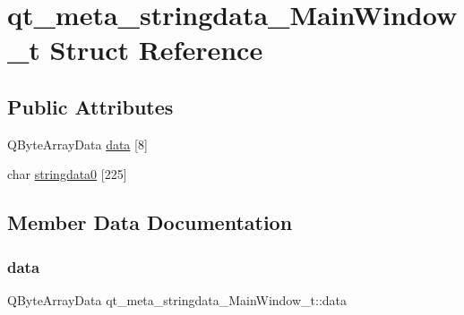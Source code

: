 \hypertarget{structqt__meta__stringdata___main_window__t}{}\section{qt\+\_\+meta\+\_\+stringdata\+\_\+\+Main\+Window\+\_\+t Struct Reference}
\label{structqt__meta__stringdata___main_window__t}
\subsection*{Public Attributes}
\begin{DoxyCompactItemize}
\item 
Q\+Byte\+Array\+Data \hyperlink{structqt__meta__stringdata___main_window__t_a092956d0ba2e51cd73092e8a5ebb6ce6}{data} \mbox{[}8\mbox{]}
\item 
char \hyperlink{structqt__meta__stringdata___main_window__t_a88959992f1140a84ca21ab555f0345a1}{stringdata0} \mbox{[}225\mbox{]}
\end{DoxyCompactItemize}


\subsection{Member Data Documentation}
\hypertarget{structqt__meta__stringdata___main_window__t_a092956d0ba2e51cd73092e8a5ebb6ce6}{}\label{structqt__meta__stringdata___main_window__t_a092956d0ba2e51cd73092e8a5ebb6ce6} 
\subsubsection{\texorpdfstring{data}{data}}
{\footnotesize\ttfamily Q\+Byte\+Array\+Data qt\+\_\+meta\+\_\+stringdata\+\_\+\+Main\+Window\+\_\+t\+::data}

\hypertarget{structqt__meta__stringdata___main_window__t_a88959992f1140a84ca21ab555f0345a1}{}\label{structqt__meta__stringdata___main_window__t_a88959992f1140a84ca21ab555f0345a1} 
